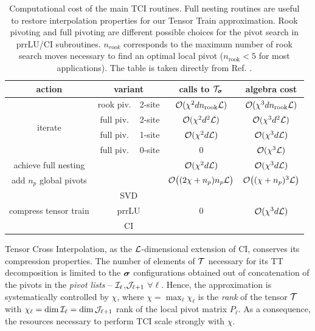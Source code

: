 \begin{table}[htbp]
	\centering
	\renewcommand{\arraystretch}{1.2} 
	\small      %
	\setlength{\tabcolsep}{4pt}  %
  
\begin{adjustbox}{max width=\textwidth} 
	\begin{tabular}{|c|c|c|c|c|}
	\hline 
	action & \multicolumn{2}{c|}{variant} & calls to $\mathcal{T}_{\boldsymbol{\sigma}}$ & algebra cost\tabularnewline
	\hline 
	\hline 
	\multirow{4}{*}{iterate} & rook piv. & 2-site & $\mathcal{O}(\chi^{2}dn_{\text{rook}}\mathcal{L})$ & $\mathcal{O}(\chi^{3}dn_{\text{rook}}\mathcal{L})$\tabularnewline
	\cline{2-5} \cline{3-5} \cline{4-5} \cline{5-5} 
	 & full piv. & 2-site & $\mathcal{O}(\chi^{2}d^{2}\mathcal{L})$ & $\mathcal{O}(\chi^{3}d^{2}\mathcal{L})$\tabularnewline
	\cline{2-5} \cline{3-5} \cline{4-5} \cline{5-5} 
	 & full piv. & 1-site & $\mathcal{O}(\chi^{2}d\mathcal{L})$ & $\mathcal{O}(\chi^{3}d\mathcal{L})$\tabularnewline
	\cline{2-5} \cline{3-5} \cline{4-5} \cline{5-5} 
	 & full piv. & 0-site & 0 & $\mathcal{O}(\chi^{3}\mathcal{L})$\tabularnewline
	\hline 
	achieve full nesting & \multicolumn{2}{c|}{} & $\mathcal{O}(\chi^{2}d\mathcal{L})$ & $\mathcal{O}(\chi^{3}d\mathcal{L})$ \tabularnewline
	\hline 
	add $n_{p}$ global pivots & \multicolumn{2}{c|}{} & $\mathcal{O}\bigl((2\chi+n_{p})n_{p}\mathcal{L}\bigr)$ & $\mathcal{O}\bigl((\chi+n_{p})^{3}\mathcal{L}\bigr)$\tabularnewline
	\hline 
	\multirow{3}{*}{compress tensor train} & \multicolumn{2}{c|}{SVD} & \multirow{3}{*}{0} & \multirow{3}{*}{$\mathcal{O}(\chi^{3}d\mathcal{L})$}\tabularnewline
	\cline{2-3} \cline{3-3} 
	 & \multicolumn{2}{c|}{prrLU} &  & \tabularnewline
	\cline{2-3} \cline{3-3} 
	 & \multicolumn{2}{c|}{CI} &  & \tabularnewline
	\hline 
	\end{tabular}
\end{adjustbox}

\caption{Computational cost of the main TCI routines. Full nesting routines are useful to restore interpolation properties for our Tensor Train approximation. Rook pivoting and full pivoting are different possible choices for the pivot search in prrLU/CI subroutines. $n_{rook}$ corresponds to the maximum number of rook search moves necessary to find an optimal local pivot ($n_{\text{rook}} < 5$ for most applications). The table is taken directly from Ref. \cite{Fernandez2024}.}
\label{tab:cost}
\end{table}	

Tensor Cross Interpolation, as the $\mathcal{L}$-dimensional extension of CI, conserves its compression properties. The number of elements of $\mathcal{T}$ necessary for its TT decomposition is limited to the $\boldsymbol{\sigma}$ configurations obtained out of concatenation of the pivots in the \textit{pivot lists} -- $\mathcal{I}_\ell$,$\mathcal{J}_{\ell +1}$ $\forall \ell$. Hence, the approximation is systematically controlled by $\chi$, where $\chi = \max_{\ell} \chi_\ell$ is the \textit{rank} of the tensor $\mathcal{T}$ with $\chi_\ell = \dim \mathcal{I}_\ell = \dim \mathcal{J}_{\ell +1}$ rank of the local pivot matrix $P_\ell$. As a consequence, the resources necessary to perform TCI scale strongly with $\chi$.

